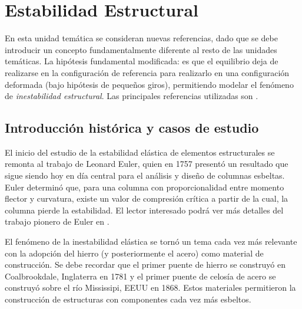 %
%
%

\chapter{Estabilidad Estructural}

En esta unidad temática se consideran nuevas referencias, dado que se debe introducir un concepto fundamentalmente diferente al resto de las unidades temáticas. %
%
La hipótesis fundamental modificada: es que el equilibrio deja de realizarse en la configuración de referencia para realizarlo en una configuración deformada (bajo hipótesis de pequeños giros), permitiendo modelar el fenómeno de \textit{inestabilidad estructural}. %
%
Las principales referencias utilizadas son \citep{yoo2011,Bazzano2017}.

\section{Introducción histórica y casos de estudio} 

El inicio del estudio de la estabilidad elástica de elementos estructurales se remonta al trabajo de Leonard Euler, quien en 1757 presentó un resultado que sigue siendo hoy en día central para el análisis y diseño de columnas esbeltas. %
%
Euler determinó que, para una columna con proporcionalidad entre momento flector y curvatura, existe un valor de compresión crítica a partir de la cual, la columna pierde la estabilidad. %
%
El lector interesado podrá ver más detalles del trabajo pionero de Euler en \citep{Timoshenko1953}.

El fenómeno de la inestabilidad elástica se tornó un tema cada vez más relevante con la adopción del hierro (y posteriormente el acero) como material de construcción. %
%
Se debe recordar que el primer puente de hierro se construyó en Coalbrookdale, Inglaterra en 1781 y el primer puente de celosía de acero se construyó sobre el río Mississipi, EEUU en 1868.  Estos materiales permitieron la construcción de estructuras con componentes cada vez más esbeltos. 

